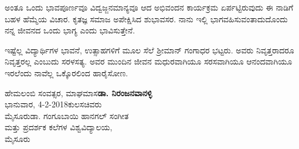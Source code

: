 ಅಂತೂ ಒಂದು ಭಾವಪೂರ್ಣವೂ ವಿದ್ವಜ್ಜನಮಾನ್ಯವೂ ಆದ ಅಭಿವಂದನ ಕಾರ್ಯಕ್ರಮ ಏರ್ಪಟ್ಟಿರುವುದು ಈ ನಾಡಿಗೆ ಬಹಳ ಹೆಮ್ಮೆಯ ವಿಚಾರ. ಕೃತಜ್ಞ ಸಮಾಜ ಅಪೇಕ್ಷಿಸಿದ ಶುಭಾವಸರ. ನಾನು ಇಲ್ಲಿ ಭಾಗವಹಿಸುವಂತಾದುದೊಂದು ನನ್ನ ಜೀವನದ ಒಂದು ಭಾಗ್ಯ ಎಂದು ಭಾವಿಸುತ್ತೇನೆ.

ಇಷ್ಟೆಲ್ಲ ವಿದ್ಯಾರ್ಥಿಗಳ ಭಾವನೆ, ಉತ್ಸಾಹಗಳಿಗೆ ಮೂಲ ಸೆಲೆ ಶ್ರೀಮಾನ್ ಗಂಗಾಧರ ಭಟ್ಟರು. ಅವರು ನಿವೃತ್ತರಾದರೂ ನಿವೃತ್ತರಲ್ಲ ಎಂಬುದು ಸರಳಸತ್ಯ. ಅವರ ಮುಂದಿನ ಜೀವನ ಮಧುರವಾಗಿಯೂ ಸರಸವಾಗಿಯೂ ಆನಂದವಾಗಿಯೂ  ಇರಲೆಂದು ನಾವೆಲ್ಲ ಒಕ್ಕೊರಲಿಂದ ಹಾರೈಸೋಣ.

\bigskip

\noindent
ಹೇಮಲಂಬಿ ಸಂವತ್ಸರ, ಮಾಘಮಾಸ\hfill \textbf{ಡಾ. ನಿರಂಜನವಾನಳ್ಳಿ}\\
ಭಾನುವಾರ, 4-2-2018\hfill ಕುಲಸಚಿವರು\\
ಮೈಸೂರು\hfill ಡಾ. ಗಂಗೂಬಾಯಿ ಹಾನಗಲ್ ಸಂಗೀತ \\
\phantom{i}\hfill ಮತ್ತು ಪ್ರದರ್ಶಕ ಕಲೆಗಳ ವಿಶ್ವವಿದ್ಯಾಲಯ,\\
\phantom{i}\hfill ಮೈಸೂರು

